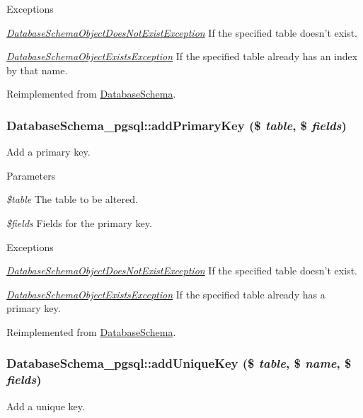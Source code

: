 \begin{DoxyExceptions}{Exceptions}
\item[{\em \hyperlink{classDatabaseSchemaObjectDoesNotExistException}{DatabaseSchemaObjectDoesNotExistException}}]If the specified table doesn't exist. \item[{\em \hyperlink{classDatabaseSchemaObjectExistsException}{DatabaseSchemaObjectExistsException}}]If the specified table already has an index by that name. \end{DoxyExceptions}


Reimplemented from \hyperlink{classDatabaseSchema_a12f4b519abe55aaef3e4d736dbb27ab7}{DatabaseSchema}.\hypertarget{classDatabaseSchema__pgsql_ad6f1224f726c193393c134c975a0cd50}{
\subsubsection[{addPrimaryKey}]{\setlength{\rightskip}{0pt plus 5cm}DatabaseSchema\_\-pgsql::addPrimaryKey (\$ {\em table}, \/  \$ {\em fields})}}
\label{classDatabaseSchema__pgsql_ad6f1224f726c193393c134c975a0cd50}
Add a primary key.


\begin{DoxyParams}{Parameters}
\item[{\em \$table}]The table to be altered. \item[{\em \$fields}]Fields for the primary key.\end{DoxyParams}

\begin{DoxyExceptions}{Exceptions}
\item[{\em \hyperlink{classDatabaseSchemaObjectDoesNotExistException}{DatabaseSchemaObjectDoesNotExistException}}]If the specified table doesn't exist. \item[{\em \hyperlink{classDatabaseSchemaObjectExistsException}{DatabaseSchemaObjectExistsException}}]If the specified table already has a primary key. \end{DoxyExceptions}


Reimplemented from \hyperlink{classDatabaseSchema_abe9490392e8408eb3847256aeb15bba0}{DatabaseSchema}.\hypertarget{classDatabaseSchema__pgsql_a950dbc66389f5bf5028dfd6b310e4092}{
\subsubsection[{addUniqueKey}]{\setlength{\rightskip}{0pt plus 5cm}DatabaseSchema\_\-pgsql::addUniqueKey (\$ {\em table}, \/  \$ {\em name}, \/  \$ {\em fields})}}
\label{classDatabaseSchema__pgsql_a950dbc66389f5bf5028dfd6b310e4092}
Add a unique key.


